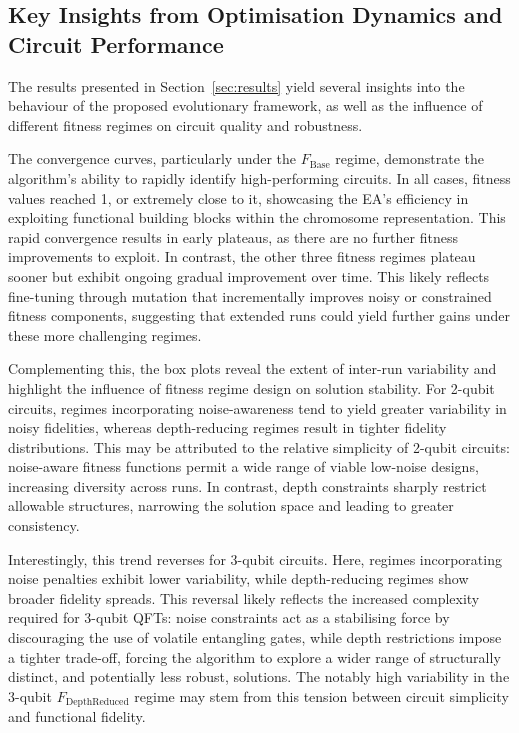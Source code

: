 \documentclass[11pt,a4paper]{article}
\begin{document}
\subsection{Key Insights from Optimisation Dynamics and Circuit Performance}
The results presented in Section~\ref{sec:results} yield several insights into the behaviour of the proposed evolutionary framework, as well as the influence of different fitness regimes on circuit quality and robustness.\newline

The convergence curves, particularly under the $F_{\mathrm{Base}}$ regime, demonstrate the algorithm’s ability to rapidly identify high-performing circuits. In all cases, fitness values reached 1, or extremely close to it, showcasing the EA’s efficiency in exploiting functional building blocks within the chromosome representation. This rapid convergence results in early plateaus, as there are no further fitness improvements to exploit. In contrast, the other three fitness regimes plateau sooner but exhibit ongoing gradual improvement over time. This likely reflects fine-tuning through mutation that incrementally improves noisy or constrained fitness components, suggesting that extended runs could yield further gains under these more challenging regimes.\newline

Complementing this, the box plots reveal the extent of inter-run variability and highlight the influence of fitness regime design on solution stability. For 2-qubit circuits, regimes incorporating noise-awareness tend to yield greater variability in noisy fidelities, whereas depth-reducing regimes result in tighter fidelity distributions. This may be attributed to the relative simplicity of 2-qubit circuits: noise-aware fitness functions permit a wide range of viable low-noise designs, increasing diversity across runs. In contrast, depth constraints sharply restrict allowable structures, narrowing the solution space and leading to greater consistency.\newline

Interestingly, this trend reverses for 3-qubit circuits. Here, regimes incorporating noise penalties exhibit lower variability, while depth-reducing regimes show broader fidelity spreads. This reversal likely reflects the increased complexity required for 3-qubit QFTs: noise constraints act as a stabilising force by discouraging the use of volatile entangling gates, while depth restrictions impose a tighter trade-off, forcing the algorithm to explore a wider range of structurally distinct, and potentially less robust, solutions. The notably high variability in the 3-qubit $F_{\mathrm{DepthReduced}}$ regime may stem from this tension between circuit simplicity and functional fidelity.\newline
\end{document}
